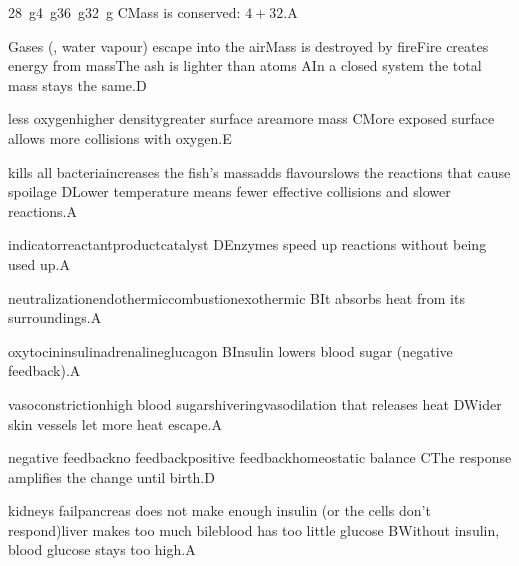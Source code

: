 \begin{gradebody}
{\SI{28}{g}}{\SI{4}{g}}{\SI{36}{g}}{\SI{32}{g}}
{C}{Mass is conserved: $4 + 32$.}{A}

{Gases (, water vapour) escape into the air}{Mass is destroyed by fire}{Fire creates energy from mass}{The ash is lighter than atoms}
{A}{In a closed system the total mass stays the same.}{D}

{less oxygen}{higher density}{greater surface area}{more mass}
{C}{More exposed surface allows more collisions with oxygen.}{E}

{kills all bacteria}{increases the fish's mass}{adds flavour}{slows the reactions that cause spoilage}
{D}{Lower temperature means fewer effective collisions and slower reactions.}{A}

{indicator}{reactant}{product}{catalyst}
{D}{Enzymes speed up reactions without being used up.}{A}

{neutralization}{endothermic}{combustion}{exothermic}
{B}{It absorbs heat from its surroundings.}{A}

{oxytocin}{insulin}{adrenaline}{glucagon}
{B}{Insulin lowers blood sugar (negative feedback).}{A}

{vasoconstriction}{high blood sugar}{shivering}{vasodilation that releases heat}
{D}{Wider skin vessels let more heat escape.}{A}

{negative feedback}{no feedback}{positive feedback}{homeostatic balance}
{C}{The response amplifies the change until birth.}{D}

{kidneys fail}{pancreas does not make enough insulin (or the cells don't respond)}{liver makes too much bile}{blood has too little glucose}
{B}{Without insulin, blood glucose stays too high.}{A}


\end{gradebody}
